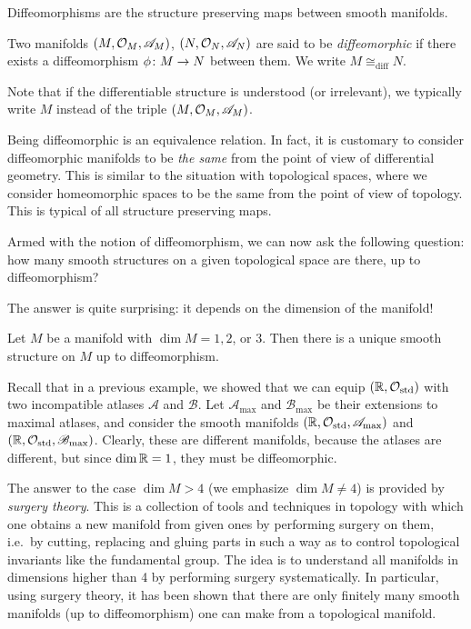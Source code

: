 Diffeomorphisms are the structure preserving maps between smooth manifolds. 

\bd
Two manifolds $(M,\mathcal{O}_M,\mathscr{A}_M)$, $(N,\mathcal{O}_N,\mathscr{A}_N)$ are said to be \emph{diffeomorphic} if there exists a diffeomorphism $\phi\colon M\to N$ between them. We write $M \cong_\text{diff}N$.
\ed

Note that if the differentiable structure is understood (or irrelevant), we typically write $M$ instead of the triple $(M,\mathcal{O}_M,\mathscr{A}_M)$.

\br
Being diffeomorphic is an equivalence relation. In fact, it is customary to consider diffeomorphic manifolds to be \emph{the same} from the point of view of differential geometry. This is similar to the situation with topological spaces, where we consider homeomorphic spaces to be the same from the point of view of topology. This is typical of all structure preserving maps.
\er

Armed with the notion of diffeomorphism, we can now ask the following question: how many smooth structures on a given topological space are there, up to diffeomorphism?

The answer is quite surprising: it depends on the dimension of the manifold!

\begin{theorem}
Let $M$ be a manifold with $\dim M = 1, 2$, or $3$. Then there is a unique smooth structure on $M$ up to diffeomorphism.
\end{theorem}

Recall that in a previous example, we showed that we can equip $(\mathbb{R},\mathcal{O}_\mathrm{std})$ with two incompatible atlases $\mathscr{A}$ and $\mathscr{B}$. Let $\mathscr{A}_\mathrm{max}$ and $\mathscr{B}_\mathrm{max}$ be their extensions to maximal atlases, and consider the smooth manifolds $(\mathbb{R},\mathcal{O}_\mathrm{std},\mathscr{A}_\mathrm{max})$ and  $(\mathbb{R},\mathcal{O}_\mathrm{std},\mathscr{B}_\mathrm{max})$. Clearly, these are different manifolds, because the atlases are different, but since $\dim \mathbb{R}=1$, they must be diffeomorphic.

The answer to the case $\dim M > 4$ (we emphasize $\dim M \neq 4$) is provided by \emph{surgery theory}. This is a collection of tools and techniques in topology with which one obtains a new manifold from given ones by performing surgery on them, i.e.\ by cutting, replacing and gluing parts in such a way as to control topological invariants like the fundamental group. The idea is to understand all manifolds in dimensions higher than 4 by performing surgery systematically. In particular, using  surgery theory, it has been shown that there are only finitely many smooth manifolds (up to diffeomorphism) one can make from a topological manifold.

